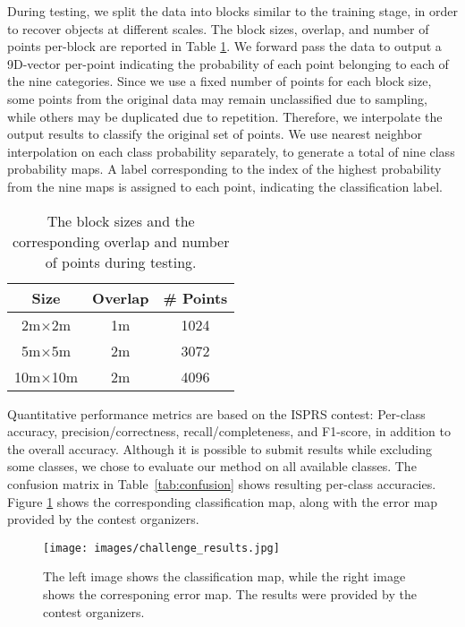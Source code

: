 \documentclass[final,3p,times,twocolumn,authoryear]{elsarticle}
\newcommand{\mxy}[1]{ \color{red}{#1}}
\begin{document}
During testing, we split the data into blocks similar to the training stage, in order to recover objects at different scales. 
The block sizes, overlap, and number of points per-block are reported in Table \ref{tab:blocks}. %
We forward pass the data to output a 9D-vector per-point indicating the probability of each point belonging to each of the nine categories. 
Since we use a fixed number of points for each block size, some points from the original data may remain unclassified due to sampling, while others may be duplicated due to repetition. 
Therefore, we interpolate the output results to classify the original set of points. 
We use nearest neighbor interpolation on each class probability separately, to generate a total of nine class probability maps. %
A label corresponding to the index of the highest probability from the nine maps is assigned to each point, indicating the classification label.
\begin{table}[t]
\centering
\caption{The block sizes and the corresponding overlap and number of points during testing.}
\label{tab:blocks}
\begin{tabular}{c|c|c}
\textbf{Size} & \textbf{Overlap} & \textbf{\# Points} \\ \hline %
2m$\times$2m            & 1m                   & 1024 \\        %
5m$\times$5m            & 2m                   & 3072 \\        %
10m$\times$10m           & 2m                   & 4096\\ \hline %
\end{tabular}
\end{table}
Quantitative performance metrics are based on the ISPRS contest: Per-class accuracy, precision/correctness, recall/completeness, and F1-score, in addition to the overall accuracy. 
Although it is possible to submit results while excluding some classes, we chose to evaluate our method on all available classes. 
The confusion matrix in Table~\ref{tab:confusion} shows resulting per-class accuracies.
Figure \ref{fig:results&rg} shows the corresponding classification map, along with the error map provided by the contest organizers. 
\begin{figure}[t]
\begin{center}
\texttt{[image: images/challenge\_results.jpg]}
\end{center}
\caption{The left image shows the classification map, while the right image shows the corresponing error map. The results were provided by the contest organizers.}
\label{fig:results&rg}
\end{figure}
\end{document}
